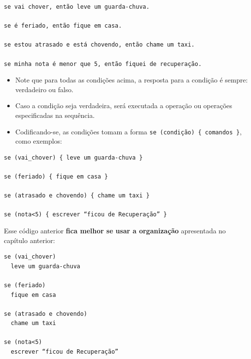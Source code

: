 \documentclass[12pt,a4paper]{article}
\begin{document}
    \begin{verbatim}
se vai chover, então leve um guarda-chuva.

se é feriado, então fique em casa.

se estou atrasado e está chovendo, então chame um taxi.

se minha nota é menor que 5, então fiquei de recuperação.
\end{verbatim}

    \begin{itemize}
\item
  Note que para todas as condições acima, a resposta para a condição é
  sempre: verdadeiro ou falso.
\item
  Caso a condição seja verdadeira, será executada a operação ou
  operações especificadas na sequência.
\item
  Codificando-se, as condições tomam a forma
  \texttt{se\ (condição)\ \{\ comandos\ \}}, como exemplos:
\end{itemize}

    \begin{verbatim}
se (vai_chover) { leve um guarda-chuva }

se (feriado) { fique em casa }

se (atrasado e chovendo) { chame um taxi }

se (nota<5) { escrever “ficou de Recuperação” }
\end{verbatim}

    Esse código anterior \textbf{fica melhor se usar a organização}
apresentada no capítulo anterior:

    \begin{verbatim}
se (vai_chover) 
  leve um guarda-chuva 

se (feriado) 
  fique em casa 

se (atrasado e chovendo)  
  chame um taxi 

se (nota<5) 
  escrever “ficou de Recuperação” 
\end{verbatim}
\end{document}
